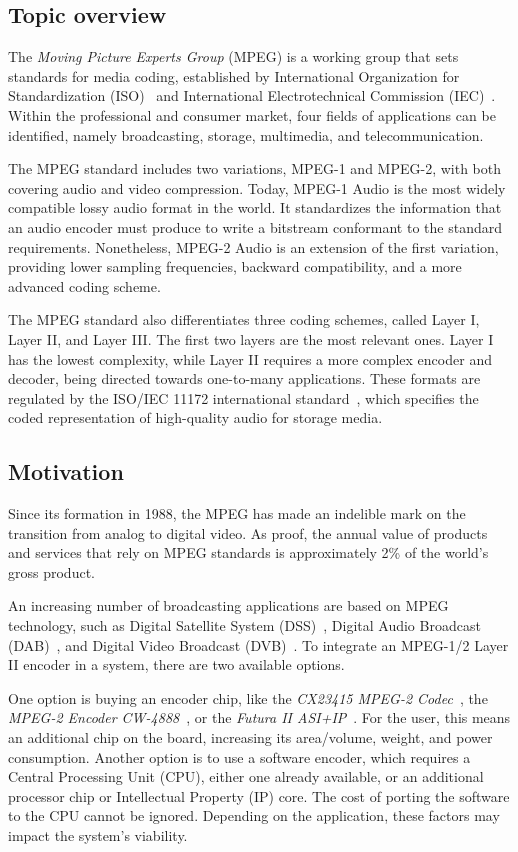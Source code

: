 \subsection{Topic overview}

The \textit{Moving Picture Experts Group} (MPEG) is a working group that sets standards for media coding, established by International Organization for Standardization (ISO)~\cite{iso} and International Electrotechnical Commission (IEC)~\cite{iec}. Within the professional and consumer market, four fields of applications can be identified, namely broadcasting, storage, multimedia, and telecommunication.

The MPEG standard includes two variations, MPEG-1 and MPEG-2, with both covering audio and video compression.  Today, MPEG-1 Audio is the most widely compatible lossy audio format in the world. It standardizes the information that an audio encoder must produce to write a bitstream conformant to the standard requirements.  Nonetheless, MPEG-2 Audio is an extension of the first variation, providing lower sampling frequencies, backward compatibility, and a more advanced coding scheme.

The MPEG standard also differentiates three coding schemes, called Layer I, Layer II, and Layer III.  The first two layers are the most relevant ones. Layer I has the lowest complexity, while Layer II requires a more complex encoder and decoder, being directed towards one-to-many applications. These formats are regulated by the ISO/IEC 11172 international standard~\cite{11172}, which specifies the coded representation of high-quality audio for storage media.

\subsection{Motivation}

Since its formation in 1988, the MPEG has made an indelible mark on the transition from analog to digital video. As proof, the annual value of products and services that rely on MPEG standards is approximately 2\% of the world's gross product.

An increasing number of broadcasting applications are based on MPEG technology, such as Digital Satellite System (DSS)~\cite{dss}, Digital Audio Broadcast (DAB)~\cite{dab}, and Digital Video Broadcast (DVB)~\cite{dvb}. To integrate an MPEG-1/2 Layer II encoder in a system, there are two available options.

One option is buying an encoder chip, like the \textit{CX23415 MPEG-2 Codec}~\cite{cx23415}, the \textit{MPEG-2 Encoder CW-4888}~\cite{cw4888}, or the \textit{Futura II ASI+IP}~\cite{futura}. For the user, this means an additional chip on the board, increasing its area/volume, weight, and power consumption. Another option is to use a software encoder, which requires a Central Processing Unit (CPU), either one already available, or an additional processor chip or Intellectual Property (IP) core. The cost of porting the software to the CPU cannot be ignored. Depending on the application, these factors may impact the system's viability.

